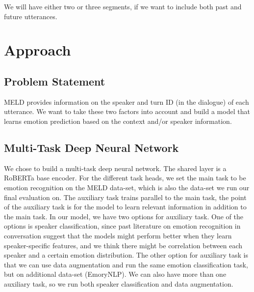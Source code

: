 \documentclass[11pt]{article}
\begin{document}
We will have either two or three segments, if we want to include both past and future utterances.


\section{Approach}
\label{sec:approach}

\subsection{Problem Statement}
MELD provides information on the speaker and turn ID (in the dialogue) of each utterance. We want to take these two factors into account and build a model that learns emotion prediction based on the context and/or speaker information.


\subsection{Multi-Task Deep Neural Network}

We chose to build a multi-task deep neural network. The shared layer is a RoBERTa base encoder. For the different task heads, we set the main task to be emotion recognition on the MELD data-set, which is also the data-set we run our final evaluation on. The auxiliary task trains parallel to the main task, the point of the auxiliary task is for the model to learn relevant information in addition to the main task. In our model, we have two options for auxiliary task. One of the options is speaker classification, since past literature on emotion recognition in conversation suggest that the models might perform better when they learn speaker-specific features, and we think there might be correlation between each speaker and a certain emotion distribution. The other option for auxiliary task is that we can use data augmentation and run the same emotion classification task, but on additional data-set (EmoryNLP). We can also have more than one auxiliary task, so we run both speaker classification and data augmentation.
\end{document}
